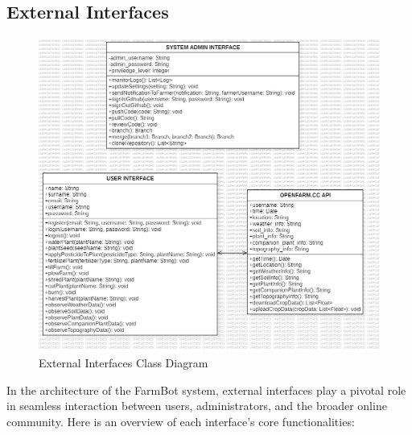 \newpage
\subsection{External Interfaces}
\begin{figure}[htbp]
    \centering
    \includegraphics[width=1\linewidth]{Figures/external_interfaces.jpg}
    \caption{External Interfaces Class Diagram}
    \label{ExternalInterfaces}
\end{figure}
\newpage
In the architecture of the FarmBot system, external interfaces play a pivotal role in seamless interaction between users, administrators, and the broader online community. Here is an overview of each interface's core functionalities:
